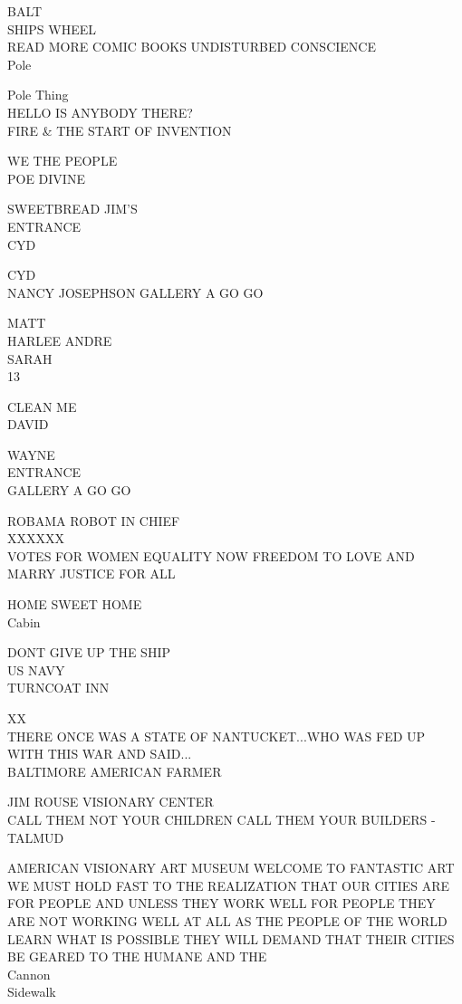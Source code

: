 \documentclass[10pt,letterpaper]{article}
\begin{document}
BALT\\
SHIPS WHEEL\\
READ MORE COMIC BOOKS UNDISTURBED CONSCIENCE\\
Pole

Pole Thing\\
HELLO IS ANYBODY THERE?\\
FIRE \& THE START OF INVENTION

WE THE PEOPLE\\
POE DIVINE

SWEETBREAD JIM'S\\
ENTRANCE\\
CYD

CYD\\
NANCY JOSEPHSON GALLERY A GO GO

MATT\\
HARLEE ANDRE\\
SARAH\\
13

CLEAN ME\\
DAVID

WAYNE\\
ENTRANCE\\
GALLERY A GO GO

ROBAMA ROBOT IN CHIEF\\
XXXXXX\\
VOTES FOR WOMEN EQUALITY NOW FREEDOM TO LOVE AND MARRY JUSTICE FOR ALL

HOME SWEET HOME\\
Cabin

DONT GIVE UP THE SHIP\\
US NAVY\\
TURNCOAT INN

XX\\
THERE ONCE WAS A STATE OF NANTUCKET...WHO WAS FED UP WITH THIS WAR AND SAID...\\
BALTIMORE AMERICAN FARMER

JIM ROUSE VISIONARY CENTER\\
CALL THEM NOT YOUR CHILDREN CALL THEM YOUR BUILDERS {-} TALMUD

AMERICAN VISIONARY ART MUSEUM WELCOME TO FANTASTIC ART\\
WE MUST HOLD FAST TO THE REALIZATION THAT OUR CITIES ARE FOR PEOPLE AND UNLESS THEY WORK WELL FOR PEOPLE THEY ARE NOT WORKING WELL AT ALL AS THE PEOPLE OF THE WORLD LEARN WHAT IS POSSIBLE THEY WILL DEMAND THAT THEIR CITIES BE GEARED TO THE HUMANE AND THE\\
Cannon\\
Sidewalk
\end{document}
